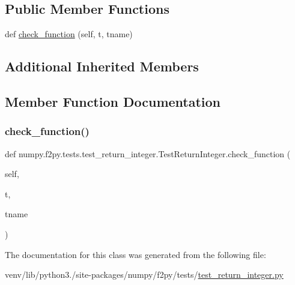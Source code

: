 \subsection*{Public Member Functions}
\begin{DoxyCompactItemize}
\item 
def \hyperlink{classnumpy_1_1f2py_1_1tests_1_1test__return__integer_1_1TestReturnInteger_a4dca2ac6ff57852cbc8d075d18a5626a}{check\+\_\+function} (self, t, tname)
\end{DoxyCompactItemize}
\subsection*{Additional Inherited Members}


\subsection{Member Function Documentation}
\mbox{\label{classnumpy_1_1f2py_1_1tests_1_1test__return__integer_1_1TestReturnInteger_a4dca2ac6ff57852cbc8d075d18a5626a}} 
\subsubsection{\texorpdfstring{check\+\_\+function()}{check\_function()}}
{\footnotesize\ttfamily def numpy.\+f2py.\+tests.\+test\+\_\+return\+\_\+integer.\+Test\+Return\+Integer.\+check\+\_\+function (\begin{DoxyParamCaption}\item[{}]{self,  }\item[{}]{t,  }\item[{}]{tname }\end{DoxyParamCaption})}



The documentation for this class was generated from the following file\+:\begin{DoxyCompactItemize}
\item 
venv/lib/python3./site-\/packages/numpy/f2py/tests/\hyperlink{test__return__integer_8py}{test\+\_\+return\+\_\+integer.\+py}\end{DoxyCompactItemize}
